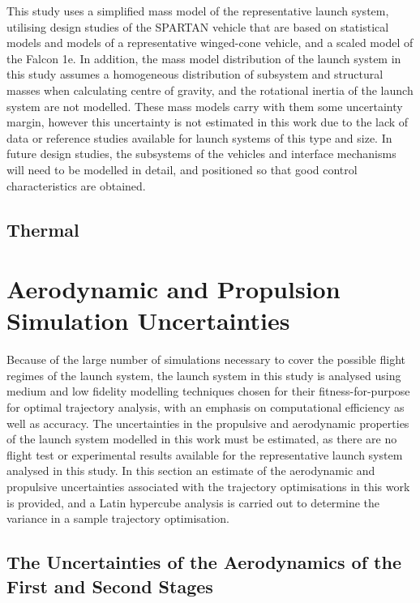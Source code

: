 This study uses a simplified mass model of the representative launch system, utilising design studies of the SPARTAN vehicle\cite{Preller2017b} that are based on statistical models and models of a representative winged-cone vehicle\cite{Preller2018}, and a scaled model of the Falcon 1e\cite{Vehicle2008}. In addition, the mass model distribution of the launch system in this study assumes a homogeneous distribution of subsystem and structural masses when calculating centre of gravity, and the rotational inertia of the launch system are not modelled.
These mass models carry with them some uncertainty margin, however this uncertainty is not estimated in this work due to the lack of data or reference studies available for launch systems of this type and size. 
In future design studies, the subsystems of the vehicles and interface mechanisms will need to be modelled in detail, and positioned so that good control characteristics are obtained. 



\subsection{Thermal}




\section{Aerodynamic and Propulsion Simulation Uncertainties}


Because of the large number of simulations necessary to cover the possible flight regimes of the launch system, the launch system in this study is analysed using medium and low fidelity modelling techniques chosen for their fitness-for-purpose for optimal trajectory analysis, with an emphasis on computational efficiency as well as accuracy.
The uncertainties in the propulsive and aerodynamic properties of the launch system modelled in this work must be estimated, as there are no flight test or experimental results available for the representative launch system analysed in this study. In this section an estimate of the aerodynamic and propulsive uncertainties associated with the trajectory optimisations in this work is provided, and a Latin hypercube analysis is carried out to determine the variance in a sample trajectory optimisation. 

\subsection{The Uncertainties of the Aerodynamics of the First and Second Stages}




